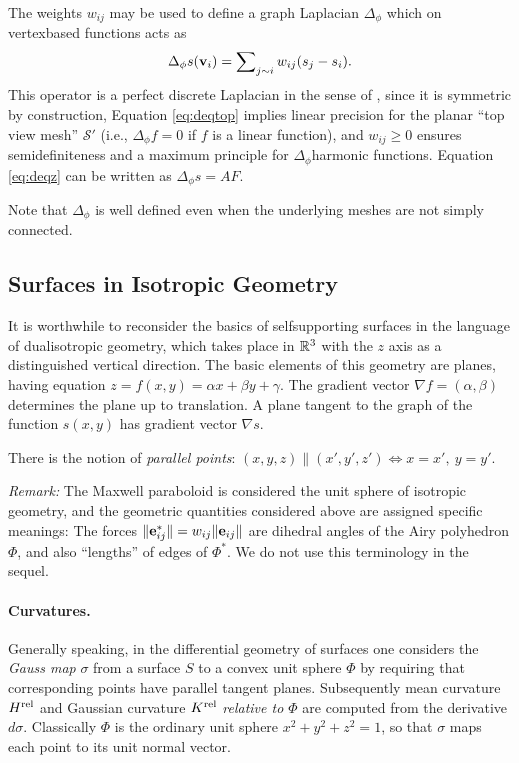 \documentclass[review]{acmsiggraph}
\def\rel{{\mathord{{\rm rel}}}}
\def\SS{{\mathcal S}}
\begin{document}
The weights $w_{ij}$ may be used to define a graph Laplacian $\Delta_\phi$ 
which on vertex\dash based functions acts as
	\begin{align*}
	\Delta_{\phi} s({\mathbf v}_i)=\sum\nolimits_{j\sim i} w_{ij}(s_j-s_i).
	\end{align*}
 This operator is a perfect discrete Laplacian in the sense of 
\cite{wardetzky07}, since it is symmetric by construction, Equation 
\eqref{eq:deqtop} implies linear precision for the planar ``top view 
mesh'' $\SS'$ (i.e., $\Delta_\phi f=0$ if $f$ is a linear function), and 
$w_{ij}\ge 0$ ensures semidefiniteness and a maximum principle for 
$\Delta_\phi$\dash harmonic functions. Equation \eqref{eq:deqz} can be 
written as $\Delta_\phi s = AF$.

Note that $\Delta_\phi$ is well defined even when the underlying meshes 
are not simply connected.

\subsection{Surfaces in Isotropic Geometry} \label{sec:smooth}

It is worthwhile to reconsider the basics of self\dash supporting surfaces 
in the language of dual\dash isotropic geometry, which takes place in 
${\mathbb R}^3$ with the $z$ axis as a distinguished vertical direction. The basic 
elements of this geometry are planes, having equation $z=f(x,y) = \alpha 
x+\beta y+\gamma$. The gradient vector $\nabla f = (\alpha,\beta)$ 
determines the plane up to translation. A plane tangent to the graph of 
the function $s(x,y)$ has gradient vector $\nabla s$.

There is the notion of {\em parallel points}:
	$
	(x,y,z) \parallel (x',y',z') \iff
	x=x',\ y=y'
	.$

{\it Remark:} The Maxwell paraboloid is considered the unit sphere of isotropic 
geometry, and the geometric quantities considered above are assigned
specific meanings: The forces $\|{\mathbf e}_{ij}^*\|=w_{ij}\|{\mathbf e}_{ij}\|$
are dihedral angles of the Airy polyhedron $\Phi$, and also ``lengths'' of
edges of $\Phi^*$. We do not use this terminology in the sequel.

\paragraph{Curvatures.}

Generally speaking, in the differential geometry of surfaces one considers 
the {\em Gauss map} $\sigma$ from a surface $S$ to a convex unit sphere 
$\Phi$ by requiring that corresponding points have parallel tangent 
planes.  Subsequently mean curvature $H^\rel$ and Gaussian curvature 
$K^\rel$ {\em relative to $\Phi$} are computed from the derivative 
$d\sigma$. Classically $\Phi$ is the ordinary unit sphere $x^2+y^2+z^2=1$, 
so that $\sigma$ maps each point to its unit normal vector.
\end{document}
